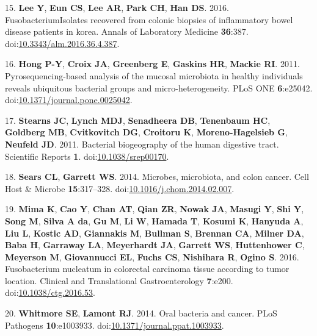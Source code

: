 \documentclass[11pt,]{article}
\begin{document}
\hypertarget{ref-Lee2016}{}
15. \textbf{Lee Y}, \textbf{Eun CS}, \textbf{Lee AR}, \textbf{Park CH},
\textbf{Han DS}. 2016. FusobacteriumIsolates recovered from colonic
biopsies of inflammatory bowel disease patients in korea. Annals of
Laboratory Medicine \textbf{36}:387.
doi:\href{https://doi.org/10.3343/alm.2016.36.4.387}{10.3343/alm.2016.36.4.387}.

\hypertarget{ref-Hong2011}{}
16. \textbf{Hong P-Y}, \textbf{Croix JA}, \textbf{Greenberg E},
\textbf{Gaskins HR}, \textbf{Mackie RI}. 2011. Pyrosequencing-based
analysis of the mucosal microbiota in healthy individuals reveals
ubiquitous bacterial groups and micro-heterogeneity. PLoS ONE
\textbf{6}:e25042.
doi:\href{https://doi.org/10.1371/journal.pone.0025042}{10.1371/journal.pone.0025042}.

\hypertarget{ref-Stearns2011}{}
17. \textbf{Stearns JC}, \textbf{Lynch MDJ}, \textbf{Senadheera DB},
\textbf{Tenenbaum HC}, \textbf{Goldberg MB}, \textbf{Cvitkovitch DG},
\textbf{Croitoru K}, \textbf{Moreno-Hagelsieb G}, \textbf{Neufeld JD}.
2011. Bacterial biogeography of the human digestive tract. Scientific
Reports \textbf{1}.
doi:\href{https://doi.org/10.1038/srep00170}{10.1038/srep00170}.

\hypertarget{ref-Sears2014}{}
18. \textbf{Sears CL}, \textbf{Garrett WS}. 2014. Microbes, microbiota,
and colon cancer. Cell Host \& Microbe \textbf{15}:317--328.
doi:\href{https://doi.org/10.1016/j.chom.2014.02.007}{10.1016/j.chom.2014.02.007}.

\hypertarget{ref-Mima2016}{}
19. \textbf{Mima K}, \textbf{Cao Y}, \textbf{Chan AT}, \textbf{Qian ZR},
\textbf{Nowak JA}, \textbf{Masugi Y}, \textbf{Shi Y}, \textbf{Song M},
\textbf{Silva A da}, \textbf{Gu M}, \textbf{Li W}, \textbf{Hamada T},
\textbf{Kosumi K}, \textbf{Hanyuda A}, \textbf{Liu L}, \textbf{Kostic
AD}, \textbf{Giannakis M}, \textbf{Bullman S}, \textbf{Brennan CA},
\textbf{Milner DA}, \textbf{Baba H}, \textbf{Garraway LA},
\textbf{Meyerhardt JA}, \textbf{Garrett WS}, \textbf{Huttenhower C},
\textbf{Meyerson M}, \textbf{Giovannucci EL}, \textbf{Fuchs CS},
\textbf{Nishihara R}, \textbf{Ogino S}. 2016. Fusobacterium nucleatum in
colorectal carcinoma tissue according to tumor location. Clinical and
Translational Gastroenterology \textbf{7}:e200.
doi:\href{https://doi.org/10.1038/ctg.2016.53}{10.1038/ctg.2016.53}.

\hypertarget{ref-Whitmore2014}{}
20. \textbf{Whitmore SE}, \textbf{Lamont RJ}. 2014. Oral bacteria and
cancer. PLoS Pathogens \textbf{10}:e1003933.
doi:\href{https://doi.org/10.1371/journal.ppat.1003933}{10.1371/journal.ppat.1003933}.
\end{document}
